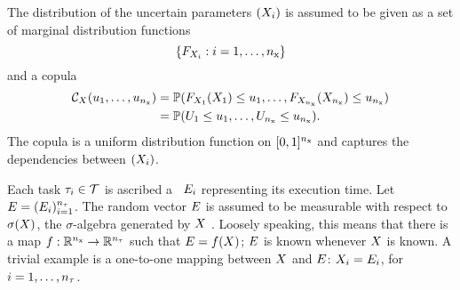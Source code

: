 The distribution of the uncertain parameters $(X_i)$ is assumed to be given as
a set of marginal distribution functions
\[
  \{ F_{X_i}: i = 1, \dots, {n_\text{x}} \}
\]
and a copula \cite{nelsen2006}
\begin{align*}
  \mathcal{C}_{X}(u_1, \dots, u_{n_\text{x}}) &= \mathbb{P}(F_{X_1}(X_1) \leq u_1, \dots, F_{X_{n_\text{x}}}(X_{n_\text{x}}) \leq u_{n_\text{x}}) \\
  &= \mathbb{P}(U_1 \leq u_1, \dots, U_{n_\text{x}} \leq u_{n_\text{x}}).
\end{align*}
The copula is a uniform distribution function on $[0, 1]^{n_\text{x}}$ and captures the
dependencies between $(X_i)$.

Each task $\tau_i \in \mathcal{T}$ is ascribed a \rv\ $E_i$ representing its
execution time. Let $E = (E_i)_{i=1}^{{n_\tau}}$. The random vector $E$ is
assumed to be measurable with respect to $\sigma(X)$, the $\sigma$-algebra
generated by $X$ \cite{durrett2010}. Loosely speaking, this means that there
is a map $f: \mathbb{R}^{n_\text{x}} \to \mathbb{R}^{n_\tau}$ such that $E = f(X)$; $E$ is known
whenever $X$ is known. A trivial example is a one-to-one mapping between $X$
and $E$: $X_i = E_i$, for $i = 1, \dots, {n_\tau}$.
